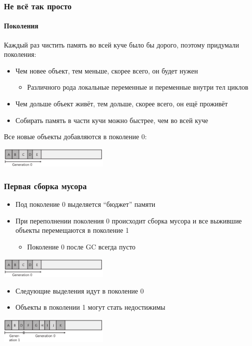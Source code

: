 \documentclass[xetex,mathserif,serif]{beamer}
\begin{document}
    \begin{frame}
        \frametitle{Не всё так просто}
        \framesubtitle{Поколения}
        Каждый раз чистить память во всей куче было бы дорого, поэтому придумали поколения:
        \begin{itemize}
            \item Чем новее объект, тем меньше, скорее всего, он будет нужен
            \begin{itemize}
                \item Различного рода локальные переменные и переменные внутри тел циклов
            \end{itemize}
            \item Чем дольше объект живёт, тем дольше, скорее всего, он ещё проживёт
            \item Собирать память в части кучи можно быстрее, чем во всей куче
        \end{itemize}
        Все новые объекты добавляются в поколение 0:
        \begin{center}
            \includegraphics[width=0.4\textwidth]{generation0.png}
        \end{center}
    \end{frame}

    \begin{frame}
        \frametitle{Первая сборка мусора}
        \begin{itemize}
            \item Под поколение 0 выделяется ``бюджет'' памяти
            \item При переполнении поколения 0 происходит сборка мусора и все выжившие объекты перемещаются в поколение 1
            \begin{itemize}
                \item Поколение 0 после GC всегда пусто
            \end{itemize}
        \end{itemize}
        \begin{center}
            \includegraphics[width=0.4\textwidth]{generation0.png}
        \end{center}
        \begin{itemize}
            \item Следующие выделения идут в поколение 0
            \item Объекты в поколении 1 могут стать недостижимы
        \end{itemize}
        \begin{center}
            \includegraphics[width=0.4\textwidth]{generation1.png}
        \end{center}
    \end{frame}
\end{document}
